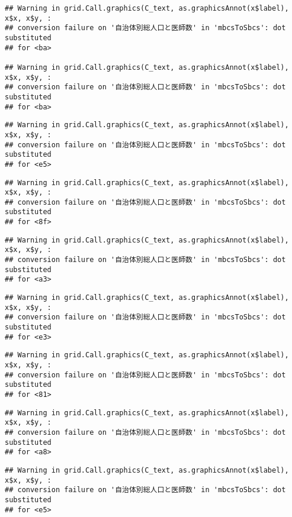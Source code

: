 \documentclass[
]{article}
\begin{document}
\begin{verbatim}
## Warning in grid.Call.graphics(C_text, as.graphicsAnnot(x$label), x$x, x$y, :
## conversion failure on '自治体別総人口と医師数' in 'mbcsToSbcs': dot substituted
## for <ba>

## Warning in grid.Call.graphics(C_text, as.graphicsAnnot(x$label), x$x, x$y, :
## conversion failure on '自治体別総人口と医師数' in 'mbcsToSbcs': dot substituted
## for <ba>
\end{verbatim}

\begin{verbatim}
## Warning in grid.Call.graphics(C_text, as.graphicsAnnot(x$label), x$x, x$y, :
## conversion failure on '自治体別総人口と医師数' in 'mbcsToSbcs': dot substituted
## for <e5>
\end{verbatim}

\begin{verbatim}
## Warning in grid.Call.graphics(C_text, as.graphicsAnnot(x$label), x$x, x$y, :
## conversion failure on '自治体別総人口と医師数' in 'mbcsToSbcs': dot substituted
## for <8f>
\end{verbatim}

\begin{verbatim}
## Warning in grid.Call.graphics(C_text, as.graphicsAnnot(x$label), x$x, x$y, :
## conversion failure on '自治体別総人口と医師数' in 'mbcsToSbcs': dot substituted
## for <a3>
\end{verbatim}

\begin{verbatim}
## Warning in grid.Call.graphics(C_text, as.graphicsAnnot(x$label), x$x, x$y, :
## conversion failure on '自治体別総人口と医師数' in 'mbcsToSbcs': dot substituted
## for <e3>
\end{verbatim}

\begin{verbatim}
## Warning in grid.Call.graphics(C_text, as.graphicsAnnot(x$label), x$x, x$y, :
## conversion failure on '自治体別総人口と医師数' in 'mbcsToSbcs': dot substituted
## for <81>
\end{verbatim}

\begin{verbatim}
## Warning in grid.Call.graphics(C_text, as.graphicsAnnot(x$label), x$x, x$y, :
## conversion failure on '自治体別総人口と医師数' in 'mbcsToSbcs': dot substituted
## for <a8>
\end{verbatim}

\begin{verbatim}
## Warning in grid.Call.graphics(C_text, as.graphicsAnnot(x$label), x$x, x$y, :
## conversion failure on '自治体別総人口と医師数' in 'mbcsToSbcs': dot substituted
## for <e5>
\end{verbatim}
\end{document}
